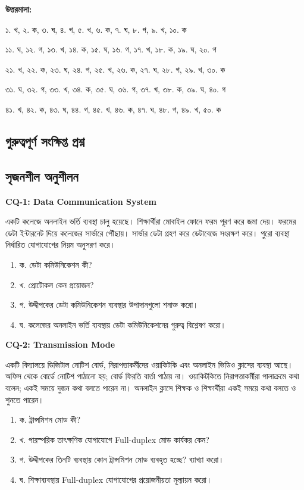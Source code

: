 \textbf{উত্তরমালা:}\par
১. খ, ২. ক, ৩. ঘ, ৪. গ, ৫. খ, ৬. ক, ৭. ঘ, ৮. গ, ৯. খ, ১০. ক\par
১১. ঘ, ১২. গ, ১৩. খ, ১৪. ক, ১৫. ঘ, ১৬. গ, ১৭. খ, ১৮. ক, ১৯. ঘ, ২০. গ\par
২১. খ, ২২. ক, ২৩. ঘ, ২৪. গ, ২৫. খ, ২৬. ক, ২৭. ঘ, ২৮. গ, ২৯. খ, ৩০. ক\par
৩১. ঘ, ৩২. গ, ৩৩. খ, ৩৪. ক, ৩৫. ঘ, ৩৬. গ, ৩৭. খ, ৩৮. ক, ৩৯. ঘ, ৪০. গ\par
৪১. খ, ৪২. ক, ৪৩. ঘ, ৪৪. গ, ৪৫. খ, ৪৬. ক, ৪৭. ঘ, ৪৮. গ, ৪৯. খ, ৫০. ক



\subsection{গুরুত্বপূর্ণ সংক্ষিপ্ত প্রশ্ন}


\subsection{সৃজনশীল অনুশীলন}

\par
\textbf{CQ-1: Data Communication System}

একটি কলেজে অনলাইন ভর্তি ব্যবস্থা চালু হয়েছে। শিক্ষার্থীরা মোবাইল ফোনে ফরম পূরণ করে জমা দেয়। ফরমের ডেটা ইন্টারনেট দিয়ে কলেজের সার্ভারে পৌঁছায়। সার্ভার ডেটা গ্রহণ করে ডেটাবেজে সংরক্ষণ করে। পুরো ব্যবস্থা নির্ধারিত যোগাযোগের নিয়ম অনুসরণ করে।

\begin{enumerate}
\item ক. ডেটা কমিউনিকেশন কী?
\item খ. প্রোটোকল কেন প্রয়োজন?
\item গ. উদ্দীপকের ডেটা কমিউনিকেশন ব্যবস্থার উপাদানগুলো শনাক্ত করো।
\item ঘ. কলেজের অনলাইন ভর্তি ব্যবস্থায় ডেটা কমিউনিকেশনের গুরুত্ব বিশ্লেষণ করো।
\end{enumerate}

\textbf{CQ-2: Transmission Mode}

একটি বিদ্যালয়ে ডিজিটাল নোটিশ বোর্ড, নিরাপত্তাকর্মীদের ওয়াকিটকি এবং অনলাইন ভিডিও ক্লাসের ব্যবস্থা আছে। অফিস থেকে বোর্ডে নোটিশ পাঠানো হয়; বোর্ড ফিরতি বার্তা পাঠায় না। ওয়াকিটকিতে নিরাপত্তাকর্মীরা পালাক্রমে কথা বলেন; একই সময়ে দুজন কথা বলতে পারেন না। অনলাইন ক্লাসে শিক্ষক ও শিক্ষার্থীরা একই সময়ে কথা বলতে ও শুনতে পারেন।

\begin{enumerate}
\item ক. ট্রান্সমিশন মোড কী?
\item খ. পারস্পরিক তাৎক্ষণিক যোগাযোগে Full-duplex মোড কার্যকর কেন?
\item গ. উদ্দীপকের তিনটি ব্যবস্থায় কোন ট্রান্সমিশন মোড ব্যবহৃত হচ্ছে? ব্যাখ্যা করো।
\item ঘ. শিক্ষাব্যবস্থায় Full-duplex যোগাযোগের প্রয়োজনীয়তা মূল্যায়ন করো।
\end{enumerate}

